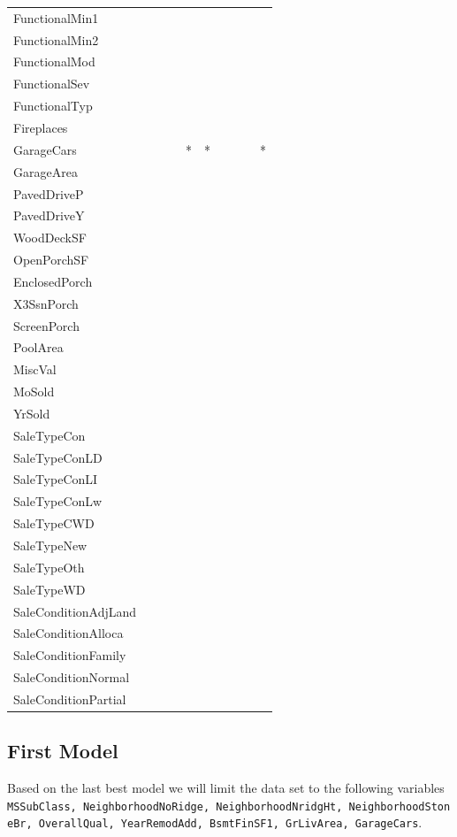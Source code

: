 \documentclass[]{article}
\begin{document}
\begin{longtable}[]{@{}llllllllll@{}}
FunctionalMin1 & & & & & & & & &\tabularnewline
FunctionalMin2 & & & & & & & & &\tabularnewline
FunctionalMod & & & & & & & & &\tabularnewline
FunctionalSev & & & & & & & & &\tabularnewline
FunctionalTyp & & & & & & & & &\tabularnewline
Fireplaces & & & & & & & & &\tabularnewline
GarageCars & & & & * & * & & & & *\tabularnewline
GarageArea & & & & & & & & &\tabularnewline
PavedDriveP & & & & & & & & &\tabularnewline
PavedDriveY & & & & & & & & &\tabularnewline
WoodDeckSF & & & & & & & & &\tabularnewline
OpenPorchSF & & & & & & & & &\tabularnewline
EnclosedPorch & & & & & & & & &\tabularnewline
X3SsnPorch & & & & & & & & &\tabularnewline
ScreenPorch & & & & & & & & &\tabularnewline
PoolArea & & & & & & & & &\tabularnewline
MiscVal & & & & & & & & &\tabularnewline
MoSold & & & & & & & & &\tabularnewline
YrSold & & & & & & & & &\tabularnewline
SaleTypeCon & & & & & & & & &\tabularnewline
SaleTypeConLD & & & & & & & & &\tabularnewline
SaleTypeConLI & & & & & & & & &\tabularnewline
SaleTypeConLw & & & & & & & & &\tabularnewline
SaleTypeCWD & & & & & & & & &\tabularnewline
SaleTypeNew & & & & & & & & &\tabularnewline
SaleTypeOth & & & & & & & & &\tabularnewline
SaleTypeWD & & & & & & & & &\tabularnewline
SaleConditionAdjLand & & & & & & & & &\tabularnewline
SaleConditionAlloca & & & & & & & & &\tabularnewline
SaleConditionFamily & & & & & & & & &\tabularnewline
SaleConditionNormal & & & & & & & & &\tabularnewline
SaleConditionPartial & & & & & & & & &\tabularnewline
\bottomrule
\end{longtable}

\normalsize

\newpage

\subsection{First Model}\label{first-model}

Based on the last best model we will limit the data set to the following
variables
\texttt{MSSubClass,\ NeighborhoodNoRidge,\ NeighborhoodNridgHt,\ NeighborhoodStoneBr,\ OverallQual,\ YearRemodAdd,\ BsmtFinSF1,\ GrLivArea,\ GarageCars}.
\end{document}
